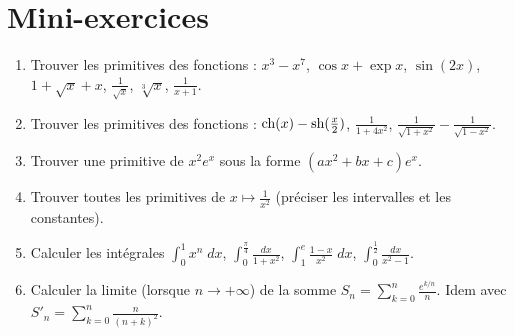 \section*{Mini-exercices}


\begin{frame}
\begin{miniexercice}
\begin{enumerate}
  \item Trouver les primitives des fonctions : $x^3-x^7$, $\cos x+\exp x$, $\sin(2x)$, $1+\sqrt{x}+x$, 
$\frac{1}{\sqrt x}$, $\sqrt[3]{x}$, $\frac{1}{x+1}$.
  \item Trouver les primitives des fonctions : $\mathop{\text{ch}}\nolimits (x)-\mathop{\text{sh}}\nolimits (\frac{x}{2})$, $\frac{1}{1+4x^2}$,
$\frac{1}{\sqrt {1+x^2}} - \frac{1}{\sqrt {1-x^2}}$.
  \item Trouver une primitive de $x^2e^x$ sous la forme $(a x^2+b x+c)e^x$.
  \item Trouver toutes les primitives de $x\mapsto \frac{1}{x^2}$ (préciser les intervalles et les constantes).
  \item Calculer les intégrales $\int_0^1 x^n \; dx$, $\int_0^{\frac\pi4} \frac{dx}{1+x^2}$, 
$\int_1^e \frac{1-x}{x^2}\; dx$, $\int_0^{\frac12} \frac{dx}{x^2-1}$.
  \item Calculer la limite (lorsque $n\to+\infty$) de la somme
$S_n = \sum_{k=0}^n \frac{e^{k/n}}{n}$. Idem avec $S'_n = \sum_{k=0}^n \frac{n}{(n+k)^2}$.
\end{enumerate}
\end{miniexercice}
\end{frame}


